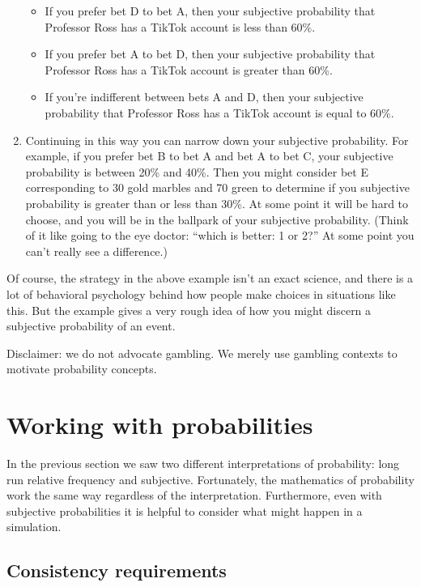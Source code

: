 \documentclass[
]{book}
\providecommand{\tightlist}{%
  \setlength{\itemsep}{0pt}\setlength{\parskip}{0pt}}
\theoremstyle{definition}
\theoremstyle{definition}
\theoremstyle{definition}
\theoremstyle{remark}
\begin{document}
\begin{enumerate}
  \begin{itemize}
  \tightlist
  \item
    If you prefer bet D to bet A, then your subjective probability that Professor Ross has a TikTok account is less than 60\%.
  \item
    If you prefer bet A to bet D, then your subjective probability that Professor Ross has a TikTok account is greater than 60\%.
  \item
    If you're indifferent between bets A and D, then your subjective probability that Professor Ross has a TikTok account is equal to 60\%.\\
  \end{itemize}
\item
  Continuing in this way you can narrow down your subjective probability. For example, if you prefer bet B to bet A and bet A to bet C, your subjective probability is between 20\% and 40\%. Then you might consider bet E corresponding to 30 gold marbles and 70 green to determine if you subjective probability is greater than or less than 30\%. At some point it will be hard to choose, and you will be in the ballpark of your subjective probability. (Think of it like going to the eye doctor: ``which is better: 1 or 2?'' At some point you can't really see a difference.)
\end{enumerate}

Of course, the strategy in the above example isn't an exact science, and there is a lot of behavioral psychology behind how people make choices in situations like this. But the example gives a very rough idea of how you might discern a subjective probability of an event.

Disclaimer: we do not advocate gambling. We merely use gambling contexts to motivate probability concepts.

\hypertarget{consistency}{%
\section{Working with probabilities}\label{consistency}}

In the previous section we saw two different interpretations of probability: long run relative frequency and subjective. Fortunately, the mathematics of probability work the same way regardless of the interpretation. Furthermore, even with subjective probabilities it is helpful to consider what might happen in a simulation.

\hypertarget{consistency-requirements}{%
\subsection{Consistency requirements}\label{consistency-requirements}}
\end{document}
